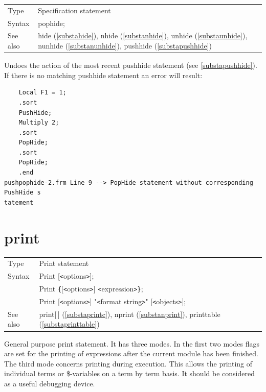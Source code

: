 \noindent \begin{tabular}{ll}
Type & Specification statement\\
Syntax & pophide;
\\ See also & hide (\ref{substahide}),
              nhide (\ref{substanhide}),
              unhide (\ref{substaunhide}),
              nunhide (\ref{substanunhide}),
              pushhide (\ref{substapushhide})
\end{tabular} \vspace{4mm}

\noindent Undoes the action of the most recent 
pushhide statement (see \ref{substapushhide}). If there is 
no matching pushhide statement an error will result:
\begin{verbatim}
    Local F1 = 1;
    .sort
    PushHide;
    Multiply 2;
    .sort
    PopHide;
    .sort
    PopHide;
    .end
pushpophide-2.frm Line 9 --> PopHide statement without corresponding PushHide s
tatement
\end{verbatim}
\vspace{10mm}

 
\section{print}
\label{substaprint}

\noindent \begin{tabular}{ll}
Type & Print statement\\
Syntax & Print [{\tt<}options{\tt>}]; \\
       & Print \verb:{:[{\tt<}options{\tt>}] {\tt<}expression{\tt>}\verb:}:; \\
       & Print [{\tt<}options{\tt>}] "{\tt<}format string{\tt>}" [{\tt<}objects{\tt>}];
\\ See also & print[\,] (\ref{substaprintc}),
              nprint (\ref{substanprint}),
              printtable (\ref{substaprinttable})
\end{tabular}\vspace{4mm}

\noindent General purpose print statement. It has three modes. In 
the first two modes flags are set for the printing of expressions after the 
current module has been finished. The third mode concerns printing during 
execution. This allows the printing of individual terms or 
\$-variables on a term by term basis. It should be 
considered as a useful debugging device.

